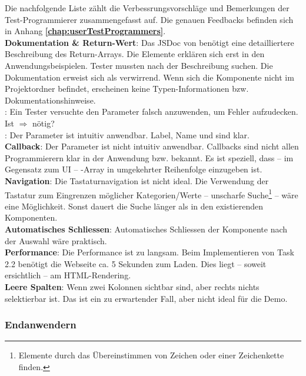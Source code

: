 Die nachfolgende Liste zählt die Verbessrungsvorschläge und Bemerkungen der Test-Programmierer zusammengefasst auf. 
Die genauen Feedbacks befinden sich in Anhang \textbf{\ref{chap:userTestProgrammers}}. 
 \\
\textbf{Dokumentation \& Return-Wert}: 
Das JSDoc von  benötigt eine detailliertere Beschreibung des Return-Arrays. 
Die Elemente erklären sich erst in den Anwendungsbeispielen. 
Tester mussten nach der Beschreibung suchen. 
Die Dokumentation erweist sich als verwirrend. 
Wenn sich die Komponente nicht im Projektordner befindet, erscheinen keine Typen-Informationen bzw. Dokumentationshinweise. 
\\
: 
Ein Tester versuchte den Parameter falsch anzuwenden, um Fehler aufzudecken. 
Ist  $\Rightarrow$  nötig? 
\\
: 
Der Parameter ist intuitiv anwendbar. 
Label, Name und  sind klar. 
\\
\textbf{Callback}: 
Der Parameter ist nicht intuitiv anwendbar. 
Callbacks sind nicht allen Programmierern klar in der Anwendung bzw. bekannt. 
Es ist speziell, dass – im Gegensatz zum UI – -Array in umgekehrter Reihenfolge einzugeben ist. 
\\
\textbf{Navigation}: 
Die Tastaturnavigation ist nicht ideal. 
Die Verwendung der Tastatur zum Eingrenzen möglicher Kategorien/Werte – unscharfe Suche\footnote{
    Elemente durch das Übereinstimmen von Zeichen oder einer Zeichenkette finden.
} – wäre eine Möglichkeit. 
Sonst dauert die Suche länger als in den existierenden Komponenten. 
\\
\textbf{Automatisches Schliessen}: 
Automatisches Schliessen der Komponente nach der Auswahl wäre praktisch. 
\\
\textbf{Performance}: 
Die Performance ist zu langsam. 
Beim Implementieren von Task 2.2 benötigt die Webseite ca. 5 Sekunden zum Laden. 
Dies liegt – soweit ersichtlich – am HTML-Rendering. 
\\
\textbf{Leere Spalten}: 
Wenn zwei Kolonnen sichtbar sind, aber rechts nichts selektierbar ist. 
Das ist ein zu erwartender Fall, aber nicht ideal für die Demo. 


\subsubsection{Endanwendern}
\label{sec:userTestsEnduser}

